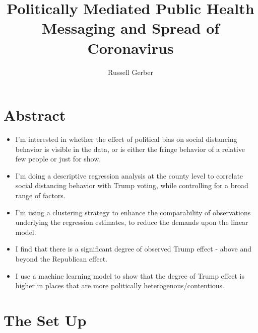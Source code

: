 \documentclass{article}
\begin{document}
\title{Politically Mediated Public Health Messaging and Spread of Coronavirus}
\author{Russell Gerber}

\section{Abstract}

\begin{itemize}
	\item I'm interested in whether the effect of political bias on social distancing behavior is visible in the data, or is either the fringe behavior of a relative few people or just for show.
	\item I'm doing a descriptive regression analysis at the county level to correlate social distancing behavior with Trump voting, while controlling for a broad range of factors.
	\item I'm using a clustering strategy to enhance the comparability of observations underlying the regression estimates, to reduce the demands upon the linear model.
	\item I find that there is a significant degree of observed Trump effect - above and beyond the Republican effect.
	\item I use a machine learning model to show that the degree of Trump effect is higher in places that are more politically heterogenous/contentious.
\end{itemize}



\section{The Set Up}
\end{document}
